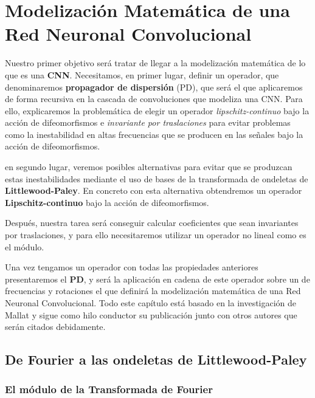 


\chapter{Modelización Matemática de una Red Neuronal Convolucional} 

\noindent Nuestro primer objetivo será tratar de llegar a la modelización matemática de lo que es una \textbf{CNN}. Necesitamos, en primer lugar, definir un operador, que denominaremos \textbf{propagador de dispersión} (PD), que será el que aplicaremos de forma recursiva en la cascada de convoluciones que modeliza una CNN. Para ello, explicaremos la problemática de elegir un operador \textit{lipschitz-continuo} bajo la acción de difeomorfismos e \textit{invariante por traslaciones} para evitar problemas como la inestabilidad en altas frecuencias que se producen en las señales bajo la acción de difeomorfismos. 

\medskip

\noindent en segundo lugar,  veremos posibles alternativas para evitar que se produzcan estas inestabilidades mediante el uso de bases de la transformada de ondeletas de \textbf{Littlewood-Paley}. En concreto con esta alternativa obtendremos un operador \textbf{Lipschitz-continuo} bajo la acción de difeomorfismos. 

\medskip

\noindent Después, nuestra tarea será conseguir calcular coeficientes que sean invariantes por traslaciones, y para ello necesitaremos utilizar un operador no lineal como es el módulo. 

\medskip

\noindent Una vez tengamos un operador con todas las propiedades anteriores presentaremos el \textbf{PD}, y será la aplicación en cadena de este operador sobre un  de frecuencias y rotaciones el que definirá la modelización matemática de una Red Neuronal Convolucional. Todo este capítulo está basado en la investigación de Mallat y sigue como hilo conductor su publicación \cite{GroupInvariantScattering} junto con otros autores que serán citados debidamente.


\section{De Fourier a las ondeletas de Littlewood-Paley}

\subsection{El módulo de la Transformada de Fourier}

